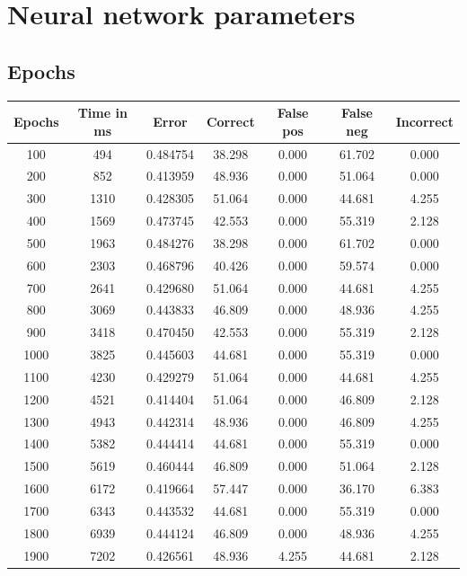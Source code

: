 \documentclass[12pt,a4,notitlepage]{report}
\renewcommand{\_}{\texttt{\symbol{95}}}
\newcommand{\<}{\texttt{\symbol{60}}}
\renewcommand{\>}{\texttt{\symbol{62}}}
\begin{document}
\section{Neural network parameters}

\subsection{Epochs}

\begin{tabular}{c|cccccc}
Epochs & Time in ms & Error & Correct & False pos & False neg & Incorrect \\ \hline
100 & 494 & 0.484754 & 38.298 & 0.000 & 61.702 & 0.000 \\
200 & 852 & 0.413959 & 48.936 & 0.000 & 51.064 & 0.000 \\
300 & 1310 & 0.428305 & 51.064 & 0.000 & 44.681 & 4.255 \\
400 & 1569 & 0.473745 & 42.553 & 0.000 & 55.319 & 2.128 \\
500 & 1963 & 0.484276 & 38.298 & 0.000 & 61.702 & 0.000 \\
600 & 2303 & 0.468796 & 40.426 & 0.000 & 59.574 & 0.000 \\
700 & 2641 & 0.429680 & 51.064 & 0.000 & 44.681 & 4.255 \\
800 & 3069 & 0.443833 & 46.809 & 0.000 & 48.936 & 4.255 \\
900 & 3418 & 0.470450 & 42.553 & 0.000 & 55.319 & 2.128 \\
1000 & 3825 & 0.445603 & 44.681 & 0.000 & 55.319 & 0.000 \\
1100 & 4230 & 0.429279 & 51.064 & 0.000 & 44.681 & 4.255 \\
1200 & 4521 & 0.414404 & 51.064 & 0.000 & 46.809 & 2.128 \\
1300 & 4943 & 0.442314 & 48.936 & 0.000 & 46.809 & 4.255 \\
1400 & 5382 & 0.444414 & 44.681 & 0.000 & 55.319 & 0.000 \\
1500 & 5619 & 0.460444 & 46.809 & 0.000 & 51.064 & 2.128 \\
1600 & 6172 & 0.419664 & 57.447 & 0.000 & 36.170 & 6.383 \\
1700 & 6343 & 0.443532 & 44.681 & 0.000 & 55.319 & 0.000 \\
1800 & 6939 & 0.444124 & 46.809 & 0.000 & 48.936 & 4.255 \\
1900 & 7202 & 0.426561 & 48.936 & 4.255 & 44.681 & 2.128 \\
\end{tabular}	
\end{document}
